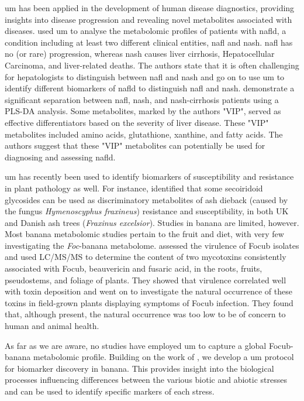 \ac{um} has been applied in the development of human disease diagnostics, providing insights into disease progression and revealing novel metabolites associated with diseases. \textcite{Masarone2021} used \ac{um} to analyse the metabolomic profiles of patients with \ac{nafld}, a condition including at least two different clinical entities, \ac{nafl} and \ac{nash}. \ac{nafl} has no (or rare) progression, whereas \ac{nash} causes liver cirrhosis, Hepatocellular Carcinoma, and liver-related deaths. The authors state that it is often challenging for hepatologists to distinguish between \ac{nafl} and \ac{nash} and go on to use \ac{um} to identify different biomarkers of \ac{nafld} to distinguish \ac{nafl} and \ac{nash}. \textcite{Masarone2021} demonstrate a significant separation between \ac{nafl}, \ac{nash}, and \ac{nash}-cirrhosis patients using a PLS-DA analysis. Some metabolites, marked by the authors "VIP", served as effective differentiators based on the severity of liver disease. These "VIP" metabolites included amino acids, glutathione, xanthine, and fatty acids. The authors suggest that these "VIP" metabolites can potentially be used for diagnosing and assessing \ac{nafld}.

\ac{um} has recently been used to identify biomarkers of susceptibility and resistance in plant pathology as well. For instance, \textcite{Sambles2017, Sidda2020} identified that some secoiridoid glycosides can be used as discriminatory metabolites of ash dieback  (caused by the fungus \textit{Hymenoscyphus fraxineus}) resistance and susceptibility,  in both UK and Danish ash trees (\textit{Fraxinus excelsior}). Studies in banana are limited, however. Most banana metabolomic studies pertain to the fruit and diet, with very few investigating the \textit{Foc}-banana metabolome. \parencite{Li2013c} assessed the virulence of \ac{Focub} isolates and used LC/MS/MS to determine the content of two mycotoxins consistently associated with \ac{Focub}, beauvericin and fusaric acid, in the roots, fruits, pseudostems, and foliage of plants. They showed that virulence correlated well with toxin deposition and went on to investigate the natural occurrence of these toxins in field-grown plants displaying symptoms of \ac{Focub} infection. They found that, although present, the natural occurrence was too low to be of concern to human and animal health.

As far as we are aware, no studies have employed \ac{um} to capture a global \ac{Focub}-banana metabolomic profile. Building on the work of \textcite{Sambles2017, Sidda2020}, we develop a \ac{um} protocol for biomarker discovery in banana. This provides insight into the biological processes influencing differences between the various biotic and abiotic stresses  and can be used to identify specific markers of each stress.

